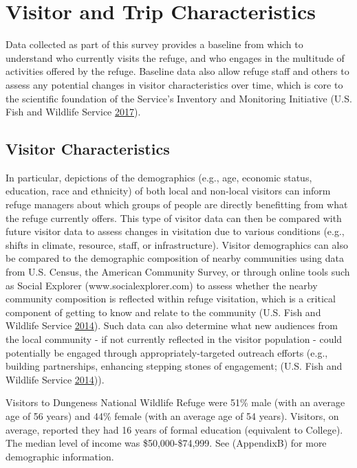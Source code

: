 \documentclass[]{book}
\let\BeginKnitrBlock\begin \let\EndKnitrBlock\end
\begin{document}
\chapter{Visitor and Trip Characteristics}\label{visit}

Data collected as part of this survey provides a baseline from which to
understand who currently visits the refuge, and who engages in the
multitude of activities offered by the refuge. Baseline data also allow
refuge staff and others to assess any potential changes in visitor
characteristics over time, which is core to the scientific foundation of
the Service's Inventory and Monitoring Initiative (U.S. Fish and
Wildlife Service \protect\hyperlink{ref-USFWS2017}{2017}).

\section{Visitor Characteristics}\label{visitor-characteristics}

\BeginKnitrBlock{preamble1}
In particular, depictions of the demographics (e.g., age, economic
status, education, race and ethnicity) of both local and non-local
visitors can inform refuge managers about which groups of people are
directly benefitting from what the refuge currently offers. This type of
visitor data can then be compared with future visitor data to assess
changes in visitation due to various conditions (e.g., shifts in
climate, resource, staff, or infrastructure). Visitor demographics can
also be compared to the demographic composition of nearby communities
using data from U.S. Census, the American Community Survey, or through
online tools such as Social Explorer (www.socialexplorer.com) to assess
whether the nearby community composition is reflected within refuge
visitation, which is a critical component of getting to know and relate
to the community (U.S. Fish and Wildlife Service
\protect\hyperlink{ref-USFWS2014}{2014}). Such data can also determine
what new audiences from the local community - if not currently reflected
in the visitor population - could potentially be engaged through
appropriately-targeted outreach efforts (e.g., building partnerships,
enhancing stepping stones of engagement; (U.S. Fish and Wildlife Service
\protect\hyperlink{ref-USFWS2014}{2014})).
\EndKnitrBlock{preamble1}

Visitors to Dungeness National Wildlife Refuge were 51\% male (with an
average age of 56 years) and 44\% female (with an average age of 54
years). Visitors, on average, reported they had 16 years of formal
education (equivalent to College). The median level of income was
\$50,000-\$74,999. See (AppendixB) for more demographic information.
\end{document}
